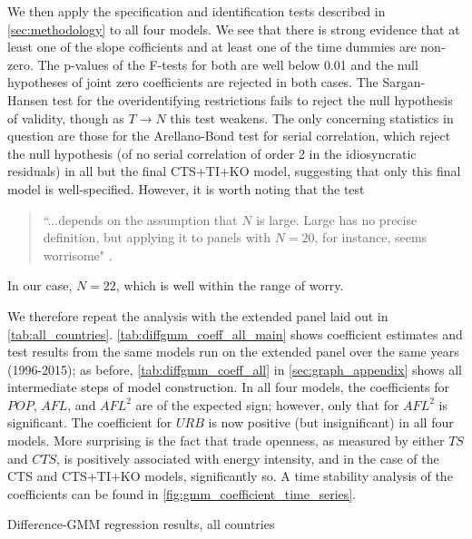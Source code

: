 \documentclass[12pt,a4paper]{article}
\begin{document}
We then apply the specification and identification tests described in \cref{sec:methodology} to all four models.
We see that there is strong evidence that at least one of the slope cofficients and at least one of the time dummies are non-zero.
The p-values of the F-tests for both are well below 0.01 and the null hypotheses of joint zero coefficients are rejected in both cases.
The Sargan-Hansen test for the overidentifying restrictions fails to reject the null hypothesis of validity, though as $T \rightarrow N$ this test weakens.
The only concerning statistics in question are those for the Arellano-Bond test for serial correlation, which reject the null hypothesis (of no serial correlation of order 2 in the idiosyncratic residuals) in all but the final CTS+TI+KO model, suggesting that only this final model is well-specified.
However, it is worth noting that the test
\begin{quote}
``...depends on the assumption that $N$ is large. Large has no precise definition, but applying it to panels with $N = 20$, for instance, seems worrisome" \cite{roodmanHowXtabond2Introduction2009}.
\end{quote} 
In our case, $N = 22$, which is well within the range of worry.

We therefore repeat the analysis with the extended panel laid out in \cref{tab:all_countries}.
\cref{tab:diffgmm_coeff_all_main} shows coefficient estimates and test results from the same models run on the extended panel over the same years (1996-2015); as before, \cref{tab:diffgmm_coeff_all} in \cref{sec:graph_appendix} shows all intermediate steps of model construction.
In all four models, the coefficients for $POP$, $AFL$, and $AFL^2$ are of the expected sign; however, only that for $AFL^2$ is significant.
The coefficient for $URB$ is now positive (but insignificant) in all four models.
More surprising is the fact that trade openness, as measured by either $TS$ and $CTS$, is positively associated with energy intensity, and in the case of the CTS and CTS+TI+KO models, significantly so.
A time stability analysis of the coefficients can be found in \cref{fig:gmm_coefficient_time_series}.

\renewcommand{\arraystretch}{3}
\begin{table}[htbp]
\centering

\caption{Difference-GMM regression results, all countries}
\label{tab:diffgmm_coeff_all_main}
\end{table}
\renewcommand{\arraystretch}{1}
\end{document}
